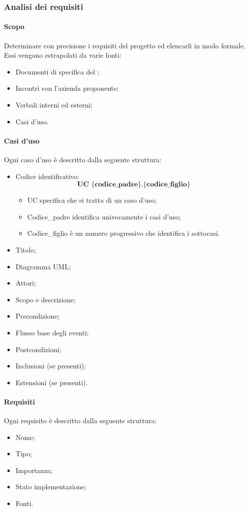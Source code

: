 \subsubsection{Analisi dei requisiti}
\paragraph{Scopo}\Spazio
Determinare con precisione i requisiti del progetto ed elencarli in modo formale. Essi vengono estrapolati da varie fonti:
\begin{itemize}
	\item Documenti di specifica del ;
	\item Incontri con l'azienda proponente;
	\item Verbali interni ed esterni;
	\item Casi d'uso.
\end{itemize}
\paragraph{Casi d'uso}\Spazio
Ogni caso d'uso è descritto dalla seguente struttura:
\begin{itemize}
	\item Codice identificativo: $$ \textbf{UC \{codice\_padre\}.\{codice\_figlio\}  } $$
		\begin{itemize}
				\item UC specifica che si tratta di un caso d'uso;
				\item Codice\_padre identifica univocamente i casi d'uso;
				\item Codice\_figlio è un numero progressivo che identifica i sottocasi.
		\end{itemize}
	\item Titolo;
	\item Diagramma UML;
	\item Attori;
	\item Scopo e descrizione;
	\item Precondizione;
	\item Flusso base degli eventi;
	\item Postcondizioni;
	\item Inclusioni (se presenti);
	\item Estensioni (se presenti).
\end{itemize}
\paragraph{Requisiti}\Spazio
Ogni requisito è descritto dalla seguente struttura:
\begin{itemize}
	\item Nome;
	\item Tipo;
	\item Importanza;
	\item Stato implementazione;
	\item Fonti.
\end{itemize}

